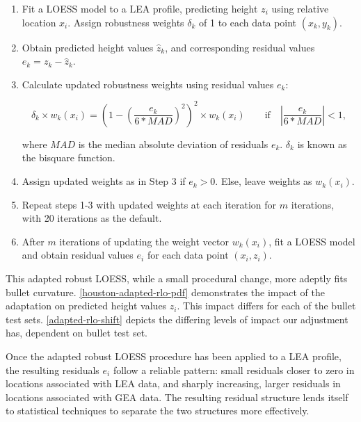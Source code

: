 \documentclass[12pt]{article}
\begin{document}
\begin{enumerate}

\item Fit a LOESS model to a LEA profile, predicting height $z_i$ using relative location $x_i$. Assign robustness weights $\delta_k$ of 1 to each data point $(x_k, y_k)$.  
\item Obtain predicted height values $\widehat{z}_k$, and corresponding residual values $e_k = z_k - \widehat{z}_k$. 
\item Calculate updated robustness weights using residual values $e_k$: 

$$\delta_k \times w_k(x_i) =\left(1 - \left(\frac{e_k}{6*MAD}\right)^2\right)^2 \times w_k(x_i) \quad \quad \mbox{if}\quad \left|\frac{e_k}{6*MAD} \right| < 1,$$

where $MAD$ is the median absolute deviation of residuals $e_k$. $\delta_k$ is known as the bisquare function.  
\item Assign updated weights as in Step 3 if $e_k > 0$. Else, leave weights as $w_k(x_i)$. 
\item Repeat steps 1-3 with updated weights at each iteration for $m$ iterations, with 20 iterations as the default.  
\item After $m$ iterations of updating the weight vector $w_k(x_i)$, fit a LOESS model and obtain residual values $e_i$ for each data point $(x_i, z_i)$.  

\end{enumerate}

This adapted robust LOESS, while a small procedural change, more adeptly
fits bullet curvature. \autoref{houston-adapted-rlo-pdf} demonstrates
the impact of the adaptation on predicted height values \(z_i\). This
impact differs for each of the bullet test sets.
\autoref{adapted-rlo-shift} depicts the differing levels of impact our
adjustment has, dependent on bullet test set.
{\color{teal}{Once I have more barrel information, I could go into a little more detail here about differing barrel types/ammo types or something, but no more than a sentence to bring the point home.}}

Once the adapted robust LOESS procedure has been applied to a LEA
profile, the resulting residuals \(e_i\) follow a reliable pattern:
small residuals closer to zero in locations associated with LEA data,
and sharply increasing, larger residuals in locations associated with
GEA data. The resulting residual structure lends itself to statistical
techniques to separate the two structures more effectively.
\end{document}
